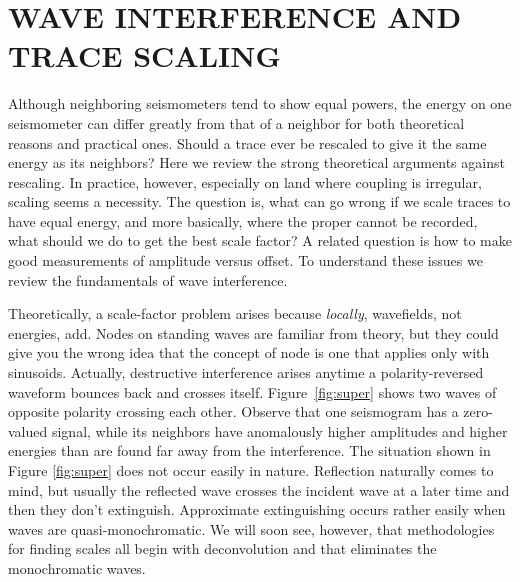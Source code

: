 \section{WAVE INTERFERENCE AND TRACE SCALING}
Although neighboring seismometers tend to show equal powers,
the energy on one seismometer can differ greatly
from that of a neighbor for both theoretical reasons
and practical ones.
Should a trace ever be rescaled
to give it the same energy as its neighbors?
Here we review the strong theoretical arguments against rescaling.
In practice,
however, especially on land where coupling is irregular,
scaling seems a necessity.
The question is,
what can go wrong if we scale traces to have equal energy,
and more basically,
where the proper  cannot be recorded,
what should we do to get the best scale factor?
A related question is how to make good measurements of amplitude versus offset.
To understand these issues we review
the fundamentals of wave interference.


\par
Theoretically, a scale-factor problem arises
because {\it locally}, wavefields, not energies, add.
Nodes on standing waves are familiar from theory,
but they could give you the wrong idea that the concept of node
is one that applies only with sinusoids.
Actually, destructive interference arises 
anytime a polarity-reversed waveform bounces back and crosses itself.
Figure~\ref{fig:super} shows two waves of opposite polarity crossing each other.
Observe that one seismogram has a zero-valued signal,
while its neighbors have anomalously higher amplitudes
and higher energies than are found far away from the interference.
The situation shown in Figure \ref{fig:super} does not occur easily in nature.
Reflection naturally comes to mind,
but usually the reflected wave
crosses the incident wave at a later time and then they don't extinguish.
Approximate extinguishing occurs rather easily 
when waves are quasi-monochromatic.
We will soon see, however,
that methodologies for finding scales all begin with deconvolution
and that eliminates the monochromatic waves.


